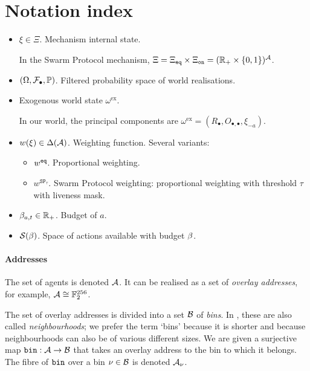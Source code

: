 \appendix

\section{Notation index}

\begin{itemize}
  \item 
    $\xi\in \Xi$. Mechanism internal state. 
    
    In the Swarm Protocol mechanism, $\Xi=\Xi_{\mathtt{eq}}\times\Xi_{\mathtt{on}}=(\mathbb{R}_+\times\{0,1\})^{\mathcal{A}}$.
  \item $(\Omega,\mathcal{F}_\bullet,\mathbb{P})$. Filtered probability space of world realisations.
  \item 
    Exogenous world state $\omega^\mathrm{ex}$. 
    
    In our world, the principal components are $\omega^\mathrm{ex}=(R_\bullet,O_{\bullet,\bullet},\xi_{-a})$.
  \item
    $w(\xi)\in\Delta(\mathcal{A})$. Weighting function. Several variants:
    \begin{itemize}
      \item $w^{\mathtt{eq}}$. Proportional weighting.
      \item $w^{\mathtt{SP}_\tau}$. Swarm Protocol weighting: proportional weighting with threshold $\tau$ with liveness mask.
    \end{itemize}
  \item $\beta_{a,t}\in\mathbb{R}_+$. Budget of $a$.
  \item $\mathcal{S}(\beta)$. Space of actions available with budget $\beta$.
\end{itemize}

\paragraph{Addresses}

The set of agents is denoted $\mathcal{A}$.
%
It can be realised as a set of \emph{overlay addresses}, for example, $\mathcal{A} \cong \mathbb{F}_2^{256}$.

The set of overlay addresses is divided into a set $\mathcal{B}$ of \emph{bins}.
%
In \cite{book-of-swarm}, these are also called \emph{neighbourhoods}; we prefer the term `bins' because it is shorter and because neighbourhoods can also be of various different sizes.
%
We are given a surjective map $\mathtt{bin}:\mathcal{A}\rightarrow\mathcal{B}$ that takes an overlay address to the bin to which it belongs.
%
The fibre of $\mathtt{bin}$ over a bin $\nu\in\mathcal{B}$ is denoted $\mathcal{A}_\nu$.

